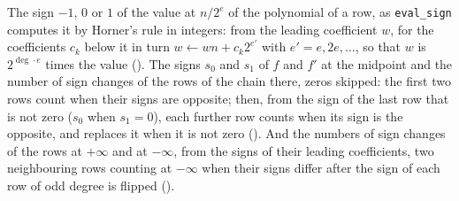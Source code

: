 \begin{definition}\label{def:evalSign}
  \leanok
  The sign $-1$, $0$ or $1$ of the value at $n/2^e$ of the polynomial of a row, as \verb|eval_sign|
  computes it by Horner's rule in integers: from the leading coefficient $w$, for the coefficients
  $c_k$ below it in turn $w \leftarrow w n + c_k 2^{e'}$ with $e' = e, 2e, \dots$, so that $w$ is
  $2^{\deg \cdot e}$ times the value (). The signs $s_0$ and $s_1$ of $f$
  and $f'$ at the midpoint and the number of sign changes of the rows of the chain there, zeros
  skipped: the first two rows count when their signs are opposite; then, from the sign of the last
  row that is not zero ($s_0$ when $s_1 = 0$), each further row counts when its sign is the
  opposite, and replaces it when it is not zero (). And the numbers of
  sign changes of the rows at $+\infty$ and at $-\infty$, from the signs of their leading
  coefficients, two neighbouring rows counting at $-\infty$ when their signs differ after the sign
  of each row of odd degree is flipped ().
\end{definition}

